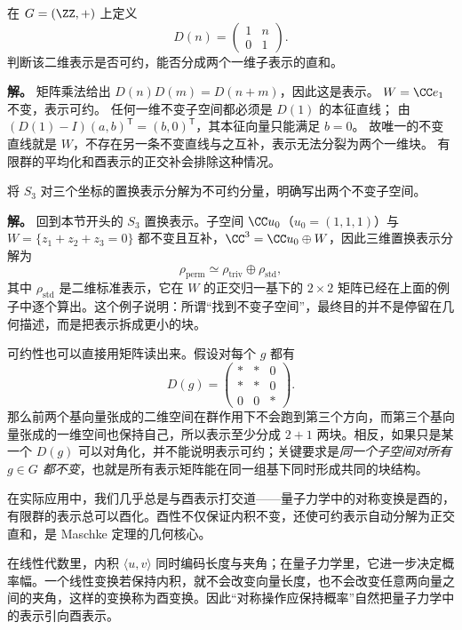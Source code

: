 \begin{example}[可约但不能分裂的无限群表示]
在 $G=(\ZZ,+)$ 上定义
\[
D(n)=\begin{pmatrix}1&n\\0&1\end{pmatrix}.
\]
判断该二维表示是否可约，能否分成两个一维子表示的直和。

\textbf{解。} 矩阵乘法给出 $D(n)D(m)=D(n+m)$，因此这是表示。
$W=\CC e_1$ 不变，表示可约。
任何一维不变子空间都必须是 $D(1)$ 的本征直线；
由 $(D(1)-I)(a,b)^\mathsf T=(b,0)^\mathsf T$，其本征向量只能满足 $b=0$。
故唯一的不变直线就是 $W$，不存在另一条不变直线与之互补，表示无法分裂为两个一维块。
有限群的平均化和酉表示的正交补会排除这种情况。
\end{example}

\begin{example}[{$S_3$ 的三维置换表示如何分解}]
将 $S_3$ 对三个坐标的置换表示分解为不可约分量，明确写出两个不变子空间。

\textbf{解。} 回到本节开头的 $S_3$ 置换表示。子空间 $\CC u_0$（$u_0=(1,1,1)$）与
$W=\{z_1+z_2+z_3=0\}$ 都不变且互补，$\CC^3=\CC u_0\oplus W$，因此三维置换表示分解为
\[
\rho_{\mathrm{perm}}\simeq \rho_{\mathrm{triv}}\oplus \rho_{\mathrm{std}},
\]
其中 $\rho_{\mathrm{std}}$ 是二维标准表示，它在 $W$ 的正交归一基下的 $2\times2$ 矩阵已经在上面的例子中逐个算出。这个例子说明：所谓“找到不变子空间”，最终目的并不是停留在几何描述，而是把表示拆成更小的块。
\end{example}

可约性也可以直接用矩阵读出来。假设对每个 $g$ 都有
\[
D(g)=
\begin{pmatrix}
* & * & 0\\
* & * & 0\\
0 & 0 & *
\end{pmatrix}.
\]
那么前两个基向量张成的二维空间在群作用下不会跑到第三个方向，而第三个基向量张成的一维空间也保持自己，所以表示至少分成 $2+1$ 两块。相反，如果只是某一个 $D(g)$ 可以对角化，并不能说明表示可约；关键要求是\emph{同一个子空间对所有 $g\in G$ 都不变}，也就是所有表示矩阵能在同一组基下同时形成共同的块结构。

在实际应用中，我们几乎总是与酉表示打交道——量子力学中的对称变换是酉的，有限群的表示总可以酉化。酉性不仅保证内积不变，还使可约表示自动分解为正交直和，是 Maschke 定理的几何核心。

在线性代数里，内积 $\langle u,v\rangle$ 同时编码长度与夹角；在量子力学里，它进一步决定概率幅。一个线性变换若保持内积，就不会改变向量长度，也不会改变任意两向量之间的夹角，这样的变换称为酉变换。因此“对称操作应保持概率”自然把量子力学中的表示引向酉表示。

